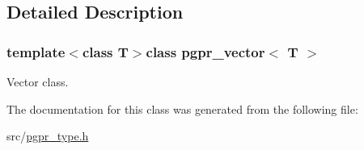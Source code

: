 \subsection{Detailed Description}
\subsubsection*{template$<$class T$>$class pgpr\-\_\-vector$<$ T $>$}

Vector class. 

The documentation for this class was generated from the following file\-:\begin{DoxyCompactItemize}
\item 
src/\hyperlink{pgpr__type_8h}{pgpr\-\_\-type.\-h}\end{DoxyCompactItemize}
